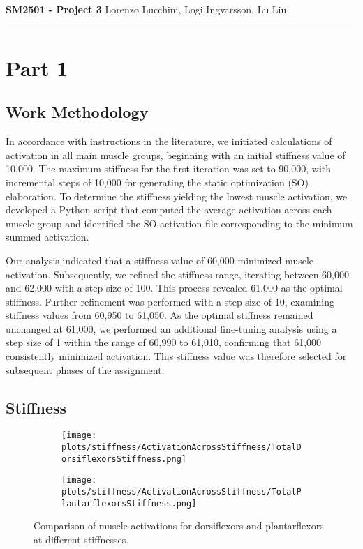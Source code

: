\documentclass[12pt]{article}
\author{Logi Ingvarsson}
\begin{document}

\begin{flushleft}
{\large{\bf{SM2501 - Project 3}} \hfill Lorenzo Lucchini, Logi Ingvarsson, Lu Liu}
\end{flushleft}
\hrule height 1pt
\bigskip

\section{Part 1}

\subsection*{Work Methodology}
In accordance with instructions in the literature, we initiated calculations of activation in all main muscle groups, beginning with an initial stiffness value of 10,000. The maximum stiffness for the first iteration was set to 90,000, with incremental steps of 10,000 for generating the static optimization (SO) elaboration. To determine the stiffness yielding the lowest muscle activation, we developed a Python script that computed the average activation across each muscle group and identified the SO activation file corresponding to the minimum summed activation.

Our analysis indicated that a stiffness value of 60,000 minimized muscle activation. Subsequently, we refined the stiffness range, iterating between 60,000 and 62,000 with a step size of 100. This process revealed 61,000 as the optimal stiffness. Further refinement was performed with a step size of 10, examining stiffness values from 60,950 to 61,050. As the optimal stiffness remained unchanged at 61,000, we performed an additional fine-tuning analysis using a step size of 1 within the range of 60,990 to 61,010, confirming that 61,000 consistently minimized activation. This stiffness value was therefore selected for subsequent phases of the assignment.

\subsection*{Stiffness}

\begin{figure}[H]
    \centering
    \begin{subfigure}[b]{0.42\textwidth} %
        \centering
        \texttt{[image: plots/stiffness/ActivationAcrossStiffness/TotalDorsiflexorsStiffness.png]}
    \end{subfigure}
    \hfill
    \begin{subfigure}[b]{0.42\textwidth} %
        \centering
        \texttt{[image: plots/stiffness/ActivationAcrossStiffness/TotalPlantarflexorsStiffness.png]}
    \end{subfigure}
    \caption{Comparison of muscle activations for dorsiflexors and plantarflexors at different stiffnesses.}
\end{figure}
\end{document}
